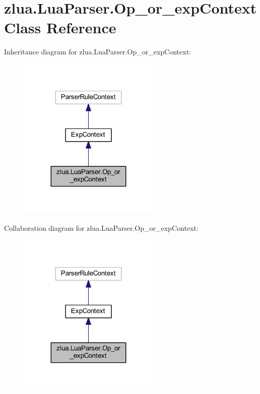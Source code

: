 \hypertarget{classzlua_1_1_lua_parser_1_1_op__or__exp_context}{}\section{zlua.\+Lua\+Parser.\+Op\+\_\+or\+\_\+exp\+Context Class Reference}
\label{classzlua_1_1_lua_parser_1_1_op__or__exp_context}


Inheritance diagram for zlua.\+Lua\+Parser.\+Op\+\_\+or\+\_\+exp\+Context\+:
\nopagebreak
\begin{figure}[H]
\begin{center}
\leavevmode
\includegraphics[width=191pt]{classzlua_1_1_lua_parser_1_1_op__or__exp_context__inherit__graph}
\end{center}
\end{figure}


Collaboration diagram for zlua.\+Lua\+Parser.\+Op\+\_\+or\+\_\+exp\+Context\+:
\nopagebreak
\begin{figure}[H]
\begin{center}
\leavevmode
\includegraphics[width=191pt]{classzlua_1_1_lua_parser_1_1_op__or__exp_context__coll__graph}
\end{center}
\end{figure}
